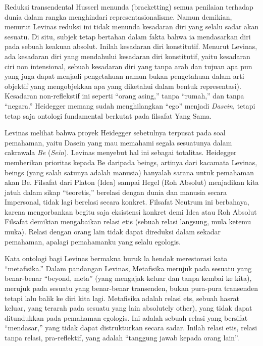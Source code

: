 \documentclass[10pt,a4paper]{article}
\begin{document}
\begin{multicols}{2}
Reduksi transendental Husserl menunda (bracketting) semua penilaian
terhadap dunia dalam rangka menghindari representasionalisme. Namun
demikian, menurut Levinas reduksi ini tidak menunda kesadaran diri yang
selalu sadar akan sesuatu. Di situ, subjek tetap bertahan dalam fakta
bahwa ia mendasarkan diri pada sebuah keakuan absolut. Inilah kesadaran
diri konstitutif. Menurut Levinas, ada kesadaran diri yang mendahului
kesadaran diri konstitutif, yaitu kesadaran ciri non intensional, sebuah
kesadaran diri yang tanpa arah dan tujuan apa pun yang juga dapat
menjadi pengetahuan namun bukan pengetahuan dalam arti objektif yang
mengobjekkan apa yang diketahui dalam bentuk representasi). Kesadaran
non-reflekstif ini seperti ``orang asing,'' tanpa ``rumah,'' dan tanpa
``negara.'' Heidegger memang sudah menghilangkan ``ego'' menjadi
\emph{Dasein}, tetapi tetap saja ontologi fundamental berkutat pada
filsafat Yang Sama.

Levinas melihat bahwa proyek Heidegger sebetulnya terpusat pada soal
pemahaman, yaitu Dasein yang mau memahami segala sesuatunya dalam
cakrawala \emph{Be} (\emph{Sein}). Levinas menyebut hal ini sebagai
totalitas. Heidegger memberikan prioritas kepada Be daripada beings,
artinya dari kacamata Levinas, beings (yang salah satunya adalah
manusia) hanyalah sarana untuk pemahaman akan Be. Filsafat dari Platon
(Idea) sampai Hegel (Roh Absolut) menjadikan kita jatuh dalam sikap
``teoretis,'' berelasi dengan dunia dan manusia secara Impersonal, tidak
lagi berelasi secara konkret. Filsafat Neutrum ini berbahaya, karena
mengorbankan begitu saja eksistensi konkret demi Idea atau Roh Absolut
Filsafat demikian mengabaikan relasi etis (sebuah relasi langsung, mula
ketemu muka). Relasi dengan orang lain tidak dapat direduksi dalam
sekadar pemahaman, apalagi pemahamanku yang selalu egologis.

Kata ontologi bagi Levinas bermakna buruk la hendak merestorasi kata
``metafisika.'' Dalam pandangan Levinas, Metafisika merujuk pada sesuatu
yang benar-benar ``beyond, meta'' (yang mengajak keluar dan tanpa kembai
ke kita), merujuk pada sesuatu yang benar-benar transenden, bukan
pura-pura transenden tetapi lalu balik ke diri kita lagi. Metafisika
adalah relasi ets, sebuah hasrat keluar, yang terarah pada sesuatu yang
lain absolutely other), yang tidak dapat ditundukkan pada pemahaman
egologis. Ini adalah sebuah relasi yang bersifat ``mendasar,'' yang
tidak dapat distrukturkan secara sadar. Inilah relasi etis, relasi tanpa
relasi, pra-reflektif, yang adalah ``tanggung jawab kepada orang lain''.


\end{multicols}
\end{document}
